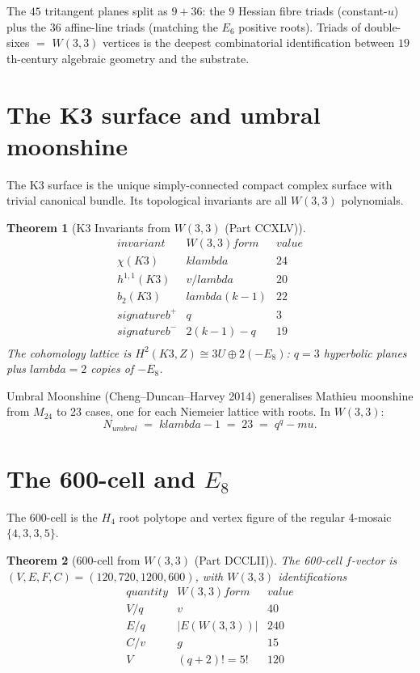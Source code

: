 \documentclass[11pt]{article}
\def\mathbb#1{#1}%
\def\mathbf#1{#1}%
\def\textbf#1{#1}%
\def\text#1{#1}%
\def\lambda{lambda}%
\def\mu{mu}%
\newtheorem*{theorem}{Theorem}
\begin{document}
The $45$ tritangent planes split as $9 + 36$: the $9$ Hessian fibre triads (constant-$u$) plus the $36$ affine-line triads (matching the $E_6$ positive roots). \textbf{Triads of double-sixes $=$ $W(3,3)$ vertices} is the deepest combinatorial identification between $19$th-century algebraic geometry and the substrate.

\section{The K3 surface and umbral moonshine}

\label{sec:k3-umbral}

The K3 surface is the unique simply-connected compact complex surface with trivial canonical bundle. Its topological invariants are all $W(3,3)$ polynomials.

\begin{theorem}[K3 Invariants from $W(3,3)$ (Part CCXLV)]
\[
\begin{array}{l|l|c}
\text{invariant} & W(3,3) \text{ form} & \text{value} \\
\hline
\chi(K3) & k\lambda & 24 \\
h^{1,1}(K3) & v/\lambda & 20 \\
b_2(K3) & \lambda(k - 1) & 22 \\
\text{signature } b^+ & q & 3 \\
\text{signature } b^- & 2(k-1)-q & 19 \\
\end{array}
\]
The cohomology lattice is $H^2(K3, \mathbb{Z}) \cong 3U \oplus 2(-E_8)$: \textbf{$q = 3$ hyperbolic planes plus $\lambda = 2$ copies of $-E_8$}.
\end{theorem}

\textbf{Umbral Moonshine} (Cheng--Duncan--Harvey 2014) generalises Mathieu moonshine from $M_{24}$ to $\mathbf{23}$ cases, one for each Niemeier lattice with roots. In $W(3,3)$:
\[
\boxed{\;N_{\text{umbral}} \;=\; k\lambda - 1 \;=\; 23 \;=\; q^q - \mu.\;}
\]

\section{\texorpdfstring{The 600-cell and $E_8$}{The 600-cell and E8}}

\label{sec:600-cell-e8}

The 600-cell is the $H_4$ root polytope and vertex figure of the regular 4-mosaic $\{4,3,3,5\}$.

\begin{theorem}[600-cell from $W(3,3)$ (Part DCCLII)]
The 600-cell $f$-vector is $(V, E, F, C) = (120, 720, 1200, 600)$, with $W(3,3)$ identifications
\[
\begin{array}{l|l|c}
\text{quantity} & W(3,3) \text{ form} & \text{value} \\
\hline
V / q & v & 40 \\
E / q & |E(W(3,3))| & 240 \\
C / v & g & 15 \\
V & (q+2)! = 5! & 120 \\
\end{array}
\]
\end{theorem}
\end{document}
